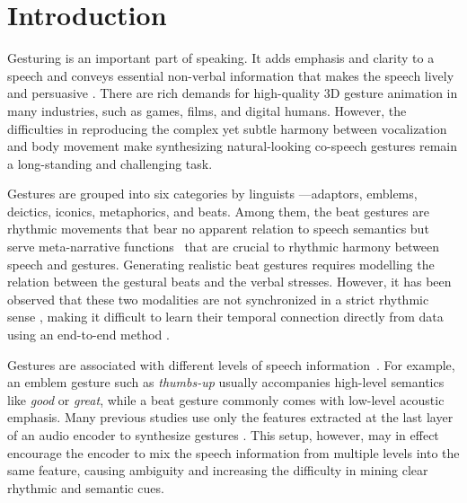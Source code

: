 \section{Introduction}
\label{sec:introduction}
Gesturing is an important part of speaking. It adds emphasis and clarity to a speech and conveys essential non-verbal information that makes the speech lively and persuasive \cite{burgoon1990nonverbal}. There are rich demands for high-quality 3D gesture animation in many industries, such as games, films, and digital humans. However, the difficulties in reproducing the complex yet subtle harmony between vocalization and body movement make synthesizing natural-looking co-speech gestures remain a long-standing and challenging task.

Gestures are grouped into six categories by linguists \cite{ekman1969repertoire, mcneill1992hand}---adaptors, emblems, deictics, iconics, metaphorics, and beats. Among them, the beat gestures are rhythmic movements that bear no apparent relation to speech semantics \cite{Kipp2004_Gesture} but serve meta-narrative functions~\cite{mcneill1992hand} that are crucial to rhythmic harmony between speech and gestures. Generating realistic beat gestures requires modelling the relation between the gestural beats and the verbal stresses. However, it has been observed that these two modalities are not synchronized in a strict rhythmic sense \cite{mcclave1994gestural}, making it difficult to learn their temporal connection directly from data using an end-to-end method \cite{kucherenko2020gesticulator, yoon2020speech, bhattacharya2021speech2affectivegestures}. 

Gestures are associated with different levels of speech information~\cite{mcneill1992hand}. For example, an emblem gesture such as \emph{thumbs-up} usually accompanies high-level semantics like \emph{good} or \emph{great}, while a beat gesture commonly comes with low-level acoustic emphasis. Many previous studies use only the features extracted at the last layer of an audio encoder to synthesize gestures \cite{kucherenko2020gesticulator, yoon2020speech, bhattacharya2021speech2affectivegestures, qian2021speech, alexanderson2020style}. This setup, however, may in effect encourage the encoder to mix the speech information from multiple levels into the same feature, causing ambiguity and increasing the difficulty in mining clear rhythmic and semantic cues.

